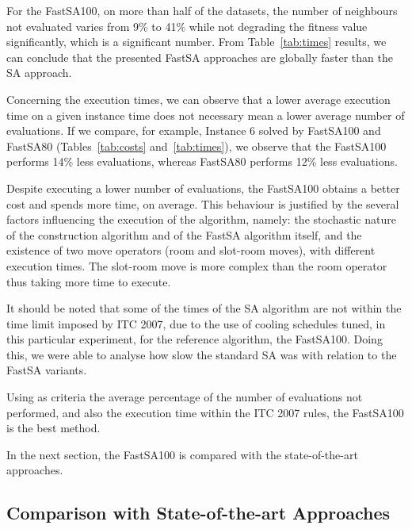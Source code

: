 For the FastSA100, on more than half of the datasets, the number of neighbours not evaluated varies from 9\% to 41\% while not degrading the fitness value significantly, which is a significant number. From Table~\ref{tab:times} results, we can conclude that the presented FastSA approaches are globally faster than the SA approach.

Concerning the execution times, we can observe that a lower average execution time on a given instance time does not necessary mean a lower average number of evaluations. If we compare, for example, Instance 6 solved by FastSA100 and FastSA80 (Tables~\ref{tab:costs} and~\ref{tab:times}), we observe that the FastSA100 performs 14\% less evaluations, whereas FastSA80 performs 12\% less evaluations. 

Despite executing a lower number of evaluations, the FastSA100 obtains a better cost and spends more time, on average. This behaviour is justified by the several factors influencing the execution of the algorithm, namely: the stochastic nature of the construction algorithm and of the FastSA algorithm itself, and the existence of two move operators (room and slot-room moves), with different execution times. The slot-room move is more complex than the room operator thus taking more time to execute. 

It should be noted that some of the times of the SA algorithm are not within the time limit imposed by ITC 2007, due to the use of cooling schedules tuned, in this particular experiment, for the reference algorithm, the FastSA100. Doing this, we were able to analyse how slow the standard SA was with relation to the FastSA variants. 

Using as criteria the average percentage of the number of evaluations not performed, and also the execution time within the ITC 2007 rules, the FastSA100 is the best method. 

In the next section, the FastSA100 is compared with the state-of-the-art approaches. 



\subsection{Comparison with State-of-the-art Approaches}
\label{subsec:ComparisonStateOfTheArt}


